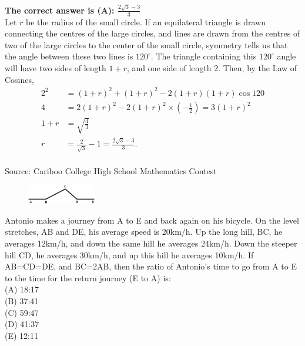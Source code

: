 \documentclass{article}
\begin{document}
\textbf{The correct answer is (A): $\frac{2\sqrt{3}-3}{3}$}\\[1 ex]
Let $r$ be the radius of the small circle. If an equilateral triangle is drawn connecting the centres of the large circles, and lines are drawn from the centres of two of the large circles to the center of the small circle, symmetry tells us that the angle between these two lines is $120^{\circ}$. The triangle containing this $120^{\circ}$ angle will have two sides of length $1+r$, and one side of length 2. Then, by the Law of Cosines,
\begin{align*}
2^2&=(1+r)^2+(1+r)^2-2(1+r)(1+r)\cos{120}\\
4&=2(1+r)^2-2(1+r)^2\times(-\frac{1}{2})=3(1+r)^2\\
1+r&=\sqrt{\frac{4}{3}}\\
r&=\frac{2}{\sqrt{3}}-1=\frac{2\sqrt{3}-3}{3}.
\end{align*}
\\[5 ex]

\scriptsize
Source: Cariboo College High School Mathematics Contest

\normalsize
\begin{figure}
	\includegraphics[width=30mm,viewport=11 234 533 389]{CCSPR74-19pic.eps}
\end{figure}
Antonio makes a journey from A to E and back again on his bicycle. On the level stretches, AB and DE, his average speed is 20km/h. Up the long hill, BC, he averages 12km/h, and down the same hill he averages 24km/h. Down the steeper hill CD, he averages 30km/h, and up this hill he averages 10km/h. If AB=CD=DE, and BC=2AB, then the ratio of Antonio's time to go from A to E to the time for the return journey (E to A) is:\\
(A) 18:17\\[1 ex]
(B) 37:41\\[1 ex]
(C) 59:47\\[1 ex]
(D) 41:37\\[1 ex]
(E) 12:11\\
\end{document}
